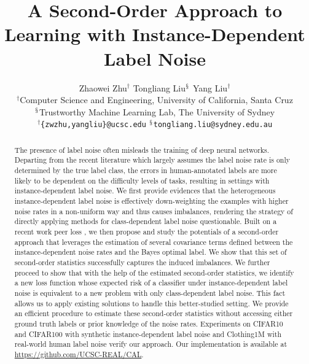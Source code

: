 \documentclass[final]{cvpr}
\begin{document}
\title{A Second-Order Approach to Learning with Instance-Dependent Label Noise}



\author{Zhaowei Zhu$^{\dagger}$ \quad Tongliang Liu$^{\mathsection}$ \quad  Yang Liu$^\dagger$\\
$^\dagger$Computer Science and Engineering, University of California, Santa Cruz \\ $^\mathsection$Trustworthy Machine Learning Lab, The University of Sydney\\
{\tt\small $^{\dagger}$\{zwzhu,yangliu\}@ucsc.edu}
\quad
{\tt\small $^{\mathsection}$tongliang.liu@sydney.edu.au}
}

\maketitle
\pagestyle{empty}  \thispagestyle{empty} 

\begin{abstract}
The presence of label noise often misleads the training of deep neural networks. Departing from the recent literature which largely assumes the label noise rate is only determined by the true label class, the errors in human-annotated labels are more likely to be dependent on the difficulty levels of tasks, resulting in settings with instance-dependent label noise. We first provide evidences that the heterogeneous instance-dependent label noise is effectively down-weighting the examples with higher noise rates in a non-uniform way and thus causes imbalances, rendering the strategy of directly applying methods for class-dependent label noise questionable. Built on a recent work peer loss \cite{liu2019peer}, we then propose and study the potentials of a second-order approach that leverages the estimation of several covariance terms defined between the instance-dependent noise rates and the Bayes optimal label. We show that this set of second-order statistics successfully captures the induced imbalances. We further proceed to show that with the help of the estimated second-order statistics, we identify a new loss function whose expected risk of a classifier under instance-dependent label noise is equivalent to a new problem with only class-dependent label noise. This fact allows us to apply existing solutions to handle this better-studied setting. We provide an efficient procedure to estimate these second-order statistics without accessing either ground truth labels or prior knowledge of the noise rates. Experiments on CIFAR10 and CIFAR100 with synthetic instance-dependent label noise and Clothing1M with real-world human label noise verify our approach. Our implementation is available at \url{https://github.com/UCSC-REAL/CAL}.
\end{abstract}
\end{document}
